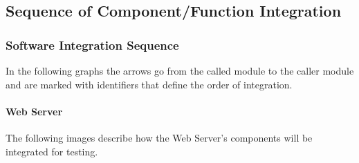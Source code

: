 \documentclass{article}
\begin{document}
\subsection{Sequence of Component/Function Integration}
\subsubsection{Software Integration Sequence}
In the following graphs the arrows go 
from the called module to the caller module
and are marked with identifiers that define
the order of integration.
\paragraph{Web Server}
The following images describe how the Web Server's 
components will be integrated for testing.
\begin{figure}[H]
\end{figure}
\begin{figure}[H]
\end{figure}
\end{document}
